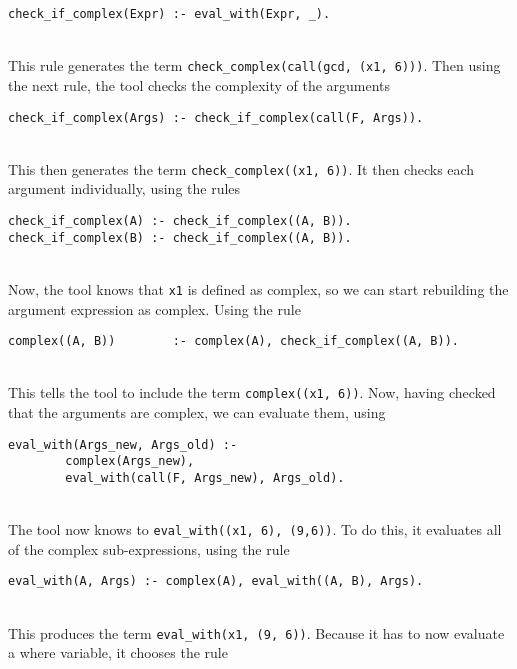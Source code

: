 \begin{lstlisting}[firstnumber=149]
check_if_complex(Expr) :- eval_with(Expr, _).
\end{lstlisting}
\mbox{} \\
This rule generates the term \lstinline!check_complex(call(gcd, (x1, 6)))!. Then using the next rule, the tool checks the complexity of the arguments \\

\begin{lstlisting}[firstnumber=151]
check_if_complex(Args) :- check_if_complex(call(F, Args)).
\end{lstlisting}
\mbox{} \\
This then generates the term \lstinline!check_complex((x1, 6))!. It then checks each argument individually, using the rules  \\

\begin{lstlisting}[firstnumber=152]
check_if_complex(A) :- check_if_complex((A, B)).
check_if_complex(B) :- check_if_complex((A, B)).
\end{lstlisting}
\mbox{} \\
Now, the tool knows that \lstinline!x1! is defined as complex, so we can start rebuilding the argument expression as complex. Using the rule  \\

\begin{lstlisting}[firstnumber=163]
complex((A, B))        :- complex(A), check_if_complex((A, B)).
\end{lstlisting}
\mbox{} \\
This tells the tool to include the term \lstinline!complex((x1, 6))!. Now, having checked that the arguments are complex, we can evaluate them, using \\

\begin{lstlisting}[firstnumber=135]
eval_with(Args_new, Args_old) :- 
		complex(Args_new), 
		eval_with(call(F, Args_new), Args_old).
\end{lstlisting}
\mbox{} \\
The tool now knows to \lstinline!eval_with((x1, 6), (9,6))!. To do this, it evaluates all of the complex sub-expressions, using the rule \\ 

\begin{lstlisting}[firstnumber=139]
eval_with(A, Args) :- complex(A), eval_with((A, B), Args).
\end{lstlisting}
\mbox{} \\
This produces the term \lstinline{eval_with(x1, (9, 6))}. Because it has to now evaluate a where variable, it chooses the rule \\ %

